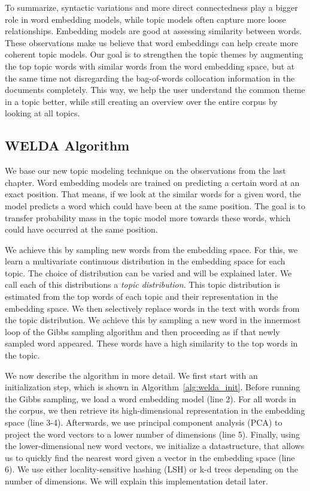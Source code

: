 \documentclass[
        a4paper,
        titlepage,
        twoside,
        parskip,
        numbers=noenddot
        ]{scrbook}
\theoremstyle{break}
\begin{document}
To summarize, syntactic variations and more direct connectedness play a bigger role in word embedding models, while topic models often capture more loose relationships.
Embedding models are good at assessing similarity between words.
These observations make us believe that word embeddings can help create more coherent topic models.
Our goal is to strengthen the topic themes by augmenting the top topic words with similar words from the word embedding space, but at the same time not disregarding the bag-of-words collocation information in the documents completely.
This way, we help the user understand the common theme in a topic better, while still creating an overview over the entire corpus by looking at all topics.

\subsection{WELDA Algorithm}

We base our new topic modeling technique on the observations from the last chapter.
Word embedding models are trained on predicting a certain word at an exact position.
That means, if we look at the similar words for a given word, the model predicts a word which could have been at the same position.
The goal is to transfer probability mass in the topic model more towards these words, which could have occurred at the same position.

We achieve this by sampling new words from the embedding space.
For this, we learn a multivariate continuous distribution in the embedding space for each topic.
The choice of distribution can be varied and will be explained later.
We call each of this distributions a \emph{topic distribution}.
This topic distribution is estimated from the top words of each topic and their representation in the embedding space.
We then selectively replace words in the text with words from the topic distribution.
We achieve this by sampling a new word in the innermost loop of the Gibbs sampling algorithm and then proceeding as if that newly sampled word appeared.
These words have a high similarity to the top words in the topic.

We now describe the algorithm in more detail.
We first start with an initialization step, which is shown in Algorithm~\ref{alg:welda_init}.
Before running the Gibbs sampling, we load a word embedding model (line 2).
For all words in the corpus, we then retrieve its high-dimensional representation in the embedding space (line 3-4).
Afterwards, we use principal component analysis (PCA) to project the word vectors to a lower number of dimensions (line 5).
Finally, using the lower-dimensional new word vectors, we initialize a datastructure, that allows us to quickly find the nearest word given a vector in the embedding space (line 6).
We use either locality-sensitive hashing (LSH) or k-d trees depending on the number of dimensions.
We will explain this implementation detail later.
\end{document}

